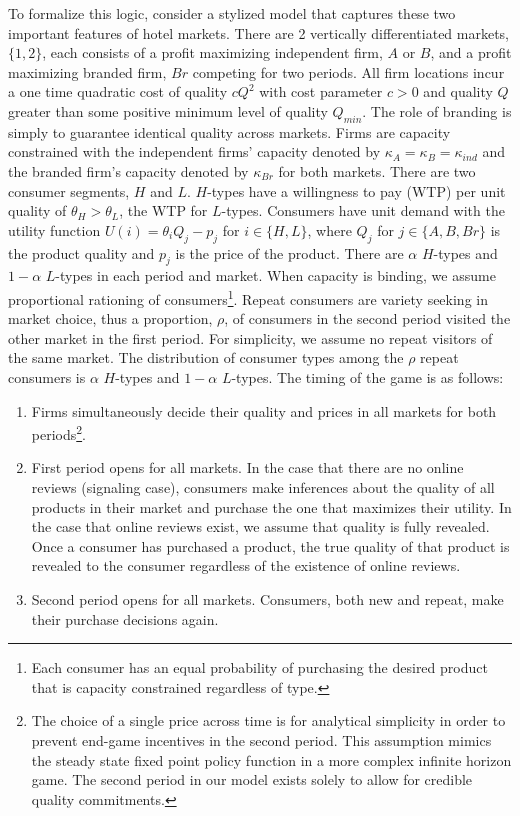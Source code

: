 \documentclass[12pt, leqno]{article}
\begin{document}
To formalize this logic, consider a  stylized model that captures these two important features of hotel markets. There are 2 vertically differentiated markets, $\{1,2\}$, each consists of a profit maximizing independent firm, $A$ or $B$, and a profit maximizing branded firm, $Br$ competing for two periods. All firm locations incur a one time quadratic cost of quality $cQ^2$ with cost parameter $c>0$ and quality $Q$ greater than some positive minimum level of quality $Q_{min}$. The role of branding is simply to guarantee identical quality across markets. Firms are capacity constrained with the independent firms' capacity denoted by $\kappa_{A}=\kappa_B=\kappa_{ind}$ and the branded firm's capacity denoted by $\kappa_{Br}$ for both markets. There are two consumer segments, $H$ and $L$. $H$-types have a willingness to pay (WTP) per unit quality of $\theta_H>\theta_L$, the WTP for $L$-types. Consumers have unit demand with the utility function $U(i)=\theta_iQ_j-p_j$ for $i \in\{H,L\}$, where $Q_j$ for $j\in\{A,B,Br\}$ is the product quality and $p_j$ is the price of the product. There are $\alpha$ $H$-types and $1-\alpha$ $L$-types in each period and market. When capacity is binding, we assume proportional rationing of consumers\footnote{Each consumer has an equal probability of purchasing the desired product that is capacity constrained regardless of type.}. Repeat consumers are variety seeking in market choice, thus a proportion, $\rho$, of consumers in the second period visited the other market in the first period. For simplicity, we assume no repeat visitors of the same market. The distribution of consumer types among the $\rho$ repeat consumers is $\alpha$ $H$-types and $1-\alpha$ $L$-types. The timing of the game is as follows:

\begin{enumerate}
\item Firms simultaneously decide their quality and prices in all markets for both periods\footnote{The choice of a single price across time is for analytical simplicity in order to prevent end-game incentives in the second period. This assumption mimics the steady state fixed point policy function in a more complex infinite horizon game. The second period in our model exists solely to allow for credible quality commitments.}. 
  \item First period opens for all markets. In the case that there are no online reviews (signaling case), consumers make inferences about the quality of all products in their market and purchase the one that maximizes their utility. In the case that online reviews exist, we assume that quality is fully revealed. Once a consumer has purchased a product, the true quality of that product is revealed to the consumer regardless of the existence of online reviews.
  \item Second period opens for all markets. Consumers, both new and repeat, make their purchase decisions again.
\end{enumerate}
\end{document}

